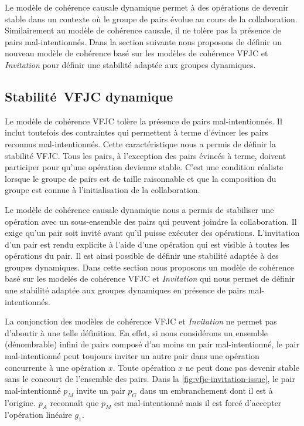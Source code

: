 Le modèle de cohérence causale dynamique permet à des opérations de devenir stable dans un contexte où le groupe de pairs évolue au cours de la collaboration.
Similairement au modèle de cohérence causale, il ne tolère pas la présence de pairs mal-intentionnés.
Dans la section suivante nous proposons de définir un nouveau modèle de cohérence basé sur les modèles de cohérence \acs{VFJC} et \emph{Invitation} pour définir une stabilité adaptée aux groupes dynamiques.


\subsection{Stabilité~\acl{VFJC} dynamique}\label{subsec:dvfjcs}

Le modèle de cohérence \ac{VFJC} tolère la présence de pairs mal-intentionnés.
Il inclut toutefois des contraintes qui permettent à terme d'évincer les pairs reconnus mal-intentionnés.
Cette caractéristique nous a permis de définir la stabilité \ac{VFJC}.
Tous les pairs, à l'exception des pairs évincés à terme, doivent participer pour qu'une opération devienne stable.
C'est une condition réaliste lorsque le groupe de pairs est de taille raisonnable et que la composition du groupe est connue à l'initialisation de la collaboration.

Le modèle de cohérence causale dynamique nous a permis de stabiliser une opération avec un sous-ensemble des pairs qui peuvent joindre la collaboration.
Il exige qu'un pair soit invité avant qu'il puisse exécuter des opérations.
L'invitation d'un pair est rendu explicite à l'aide d'une opération qui est visible à toutes les opérations du pair.
Il est ainsi possible de définir une stabilité adaptée à des groupes dynamiques.
Dans cette section nous proposons un modèle de cohérence basé sur les modelés de cohérence \acs{VFJC} et \emph{Invitation} qui nous permet de définir une stabilité adaptée aux groupes dynamiques en présence de pairs mal-intentionnés.

La conjonction des modèles de cohérence \acs{VFJC} et \emph{Invitation} ne permet pas d'aboutir à une telle définition.
En effet, si nous considérons un ensemble (dénombrable) infini de pairs composé d'au moins un pair mal-intentionné, le pair mal-intentionné peut toujours inviter un autre pair dans une opération concurrente à une opération $x$.
Toute opération $x$ ne peut donc pas devenir stable sans le concourt de l'ensemble des pairs.
Dans la \autoref{fig:vfjc-invitation-issue}, le pair mal-intentionné $p_M$ invite un pair $p_G$ dans un embranchement dont il est à l'origine.
$p_A$ reconnaît que $p_M$ est mal-intentionné mais il est forcé d'accepter l'opération linéaire $g_1$.

